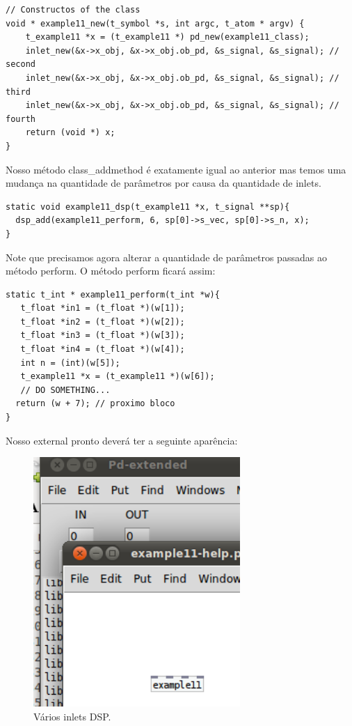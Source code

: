 \documentclass[10pt,a4paper]{report}
\begin{document}
\begin{lstlisting}
// Constructos of the class
void * example11_new(t_symbol *s, int argc, t_atom * argv) {
    t_example11 *x = (t_example11 *) pd_new(example11_class);
    inlet_new(&x->x_obj, &x->x_obj.ob_pd, &s_signal, &s_signal); // second
    inlet_new(&x->x_obj, &x->x_obj.ob_pd, &s_signal, &s_signal); // third
    inlet_new(&x->x_obj, &x->x_obj.ob_pd, &s_signal, &s_signal); // fourth
    return (void *) x;
}
\end{lstlisting}

Nosso método class\_addmethod é exatamente igual ao anterior mas temos uma mudança na quantidade de parâmetros por causa da quantidade de inlets.

\begin{lstlisting}
static void example11_dsp(t_example11 *x, t_signal **sp){
  dsp_add(example11_perform, 6, sp[0]->s_vec, sp[0]->s_n, x);
}
\end{lstlisting}

Note que precisamos agora alterar a quantidade de parâmetros passadas ao método perform. O método perform ficará assim:
\begin{lstlisting}
static t_int * example11_perform(t_int *w){
   t_float *in1 = (t_float *)(w[1]);
   t_float *in2 = (t_float *)(w[2]);
   t_float *in3 = (t_float *)(w[3]);
   t_float *in4 = (t_float *)(w[4]);
   int n = (int)(w[5]);
   t_example11 *x = (t_example11 *)(w[6]);
   // DO SOMETHING...
  return (w + 7); // proximo bloco
}
\end{lstlisting}

Nosso external pronto deverá ter a seguinte aparência:
\begin{figure}[h!]
	\centering
	\includegraphics[width=0.7\textwidth]{example11}
	\caption{Vários inlets DSP.}
\end{figure}
\end{document}

